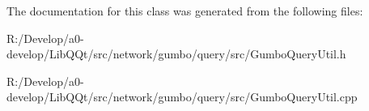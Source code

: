 The documentation for this class was generated from the following files\+:\begin{DoxyCompactItemize}
\item 
R\+:/\+Develop/a0-\/develop/\+Lib\+Q\+Qt/src/network/gumbo/query/src/Gumbo\+Query\+Util.\+h\item 
R\+:/\+Develop/a0-\/develop/\+Lib\+Q\+Qt/src/network/gumbo/query/src/Gumbo\+Query\+Util.\+cpp\end{DoxyCompactItemize}
